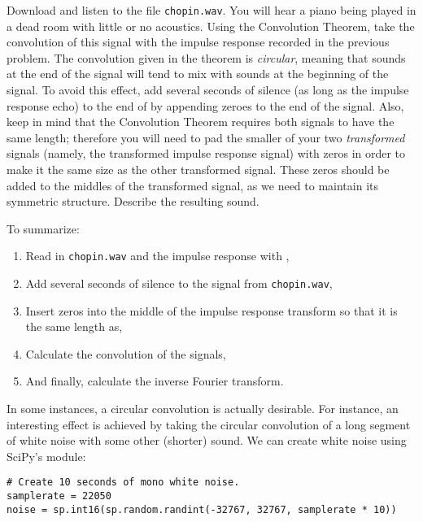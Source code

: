 \begin{problem}\label{convolution_problem}
Download and listen to the file \texttt{chopin.wav}.
You will hear a piano being played in a dead room with little or no acoustics.
Using the Convolution Theorem, take the convolution of this signal with the impulse response recorded in the previous problem.
The convolution given in the theorem is \emph{circular}, meaning that sounds at the end of the signal will tend to mix with sounds at the beginning of the signal.
To avoid this effect, add several seconds of silence (as long as the impulse response echo) to the end of  by appending zeroes to the end of the signal.
Also, keep in mind that the Convolution Theorem requires both signals to have the same length; therefore you will need to pad the smaller of your two \emph{transformed} signals (namely, the transformed impulse response signal) with zeros in order to make it the same size as the other transformed signal.
These zeros should be added to the middles of the transformed signal, as we need to maintain its symmetric structure.
Describe the resulting sound.

To summarize:
\begin{enumerate}

\item Read in \texttt{chopin.wav} and the impulse response with ,
\item Add several seconds of silence to the signal from \texttt{chopin.wav},
\item Insert zeros into the middle of the impulse response transform so that it is the same length as,
\item Calculate the convolution of the signals,
\item And finally, calculate the inverse Fourier transform.
\end{enumerate}

\end{problem}

In some instances, a circular convolution is actually desirable.
For instance, an interesting effect is achieved by taking the circular convolution of a long segment of white noise with some other (shorter) sound.
We can create white noise using SciPy's  module:
\begin{lstlisting}
# Create 10 seconds of mono white noise.
samplerate = 22050
noise = sp.int16(sp.random.randint(-32767, 32767, samplerate * 10))
\end{lstlisting}

